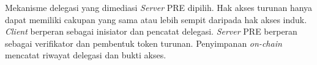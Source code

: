 Mekanisme delegasi yang dimediasi \textit{Server} PRE dipilih. Hak akses turunan hanya dapat memiliki cakupan yang sama atau lebih sempit daripada hak akses induk. \textit{Client} berperan sebagai inisiator dan pencatat delegasi. \textit{Server} PRE berperan sebagai verifikator dan pembentuk token turunan. Penyimpanan \textit{on-chain} mencatat riwayat delegasi dan bukti akses.
